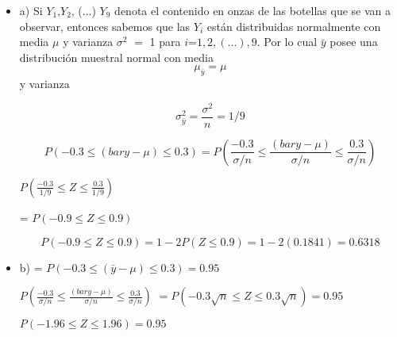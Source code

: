 \documentclass{oxmathproblems}
\begin{document}
\begin{questions}



\miquestion 



\miquestion 

\begin{itemize}
\item a) Si $Y_1$,$Y_2$, (...) $Y_9$  denota el contenido en onzas de las botellas que se van a observar, entonces sabemos que las $Y_i$ están distribuidas normalmente con media $\mu$ y varianza $\sigma^2$ $=$ 1 para $i $=$ 1,2, (...),9$. Por lo cual $\bar{y}$ posee una distribución muestral normal con media $$\mu_\bar{y} = \mu$$ y varianza 


$$\sigma^2_{\bar{y}} =  \frac{\sigma^2}{n}= 1/9 $$



$$ P(-0.3 \leq (bar{y}-\mu) \leq 0.3) 
= P(\frac{-0.3}{\sigma/n} \leq \frac{(bar{y}-\mu)}{\sigma/n} \leq \frac{0.3}{\sigma/n})
$$


$P(\frac{-0.3}{1/9} \leq Z \leq \frac{0.3}{1/9})$

= $P(-0.9 \leq Z \leq 0.9) $ 


$$P(-0.9 \leq Z \leq 0.9)  = 1- 2P(Z \leq 0.9) = 1- 2(0.1841) = 0.6318
$$


\item b)
=  $ P(-0.3 \leq (\bar{y}-\mu) \leq 0.3) = 0.95  $ 


$ P(\frac{-0.3}{\sigma/n} \leq \frac{(bar{y}-\mu)}{\sigma/n} \leq \frac{0.3}{\sigma/n}) 
$ 
$ 
= P( -0.3\sqrt{n} \leq Z \leq 0.3\sqrt{n} ) = 0.95 
$


$P( -1.96 \leq Z \leq 1.96 ) = 0.95 
$ 



\end{itemize}
\end{questions}
\end{document}
